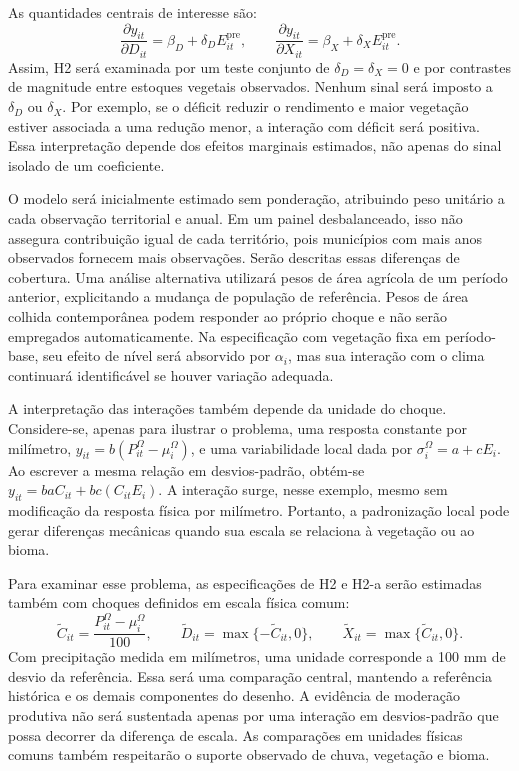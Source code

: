 As quantidades centrais de interesse são:
\begin{equation}
\frac{\partial y_{it}}{\partial D_{it}}=\beta_D+\delta_D E^{\mathrm{pre}}_{it},
\qquad
\frac{\partial y_{it}}{\partial X_{it}}=\beta_X+\delta_X E^{\mathrm{pre}}_{it}.
\label{eq:marginais}
\end{equation}
Assim, H2 será examinada por um teste conjunto de $\delta_D=\delta_X=0$ e por contrastes de magnitude entre estoques vegetais observados. Nenhum sinal será imposto a $\delta_D$ ou $\delta_X$. Por exemplo, se o déficit reduzir o rendimento e maior vegetação estiver associada a uma redução menor, a interação com déficit será positiva. Essa interpretação depende dos efeitos marginais estimados, não apenas do sinal isolado de um coeficiente.

O modelo será inicialmente estimado sem ponderação, atribuindo peso unitário a cada observação territorial e anual. Em um painel desbalanceado, isso não assegura contribuição igual de cada território, pois municípios com mais anos observados fornecem mais observações. Serão descritas essas diferenças de cobertura. Uma análise alternativa utilizará pesos de área agrícola de um período anterior, explicitando a mudança de população de referência. Pesos de área colhida contemporânea podem responder ao próprio choque e não serão empregados automaticamente. Na especificação com vegetação fixa em período-base, seu efeito de nível será absorvido por $\alpha_i$, mas sua interação com o clima continuará identificável se houver variação adequada.

A interpretação das interações também depende da unidade do choque. Considere-se, apenas para ilustrar o problema, uma resposta constante por milímetro, $y_{it}=b(P^{\Omega}_{it}-\mu_i^{\Omega})$, e uma variabilidade local dada por $\sigma_i^{\Omega}=a+cE_i$. Ao escrever a mesma relação em desvios-padrão, obtém-se $y_{it}=baC_{it}+bc(C_{it}E_i)$. A interação surge, nesse exemplo, mesmo sem modificação da resposta física por milímetro. Portanto, a padronização local pode gerar diferenças mecânicas quando sua escala se relaciona à vegetação ou ao bioma.

Para examinar esse problema, as especificações de H2 e H2-a serão estimadas também com choques definidos em escala física comum:
\begin{equation}
\widetilde C_{it}=\frac{P^{\Omega}_{it}-\mu_i^{\Omega}}{100},\qquad
\widetilde D_{it}=\max\{-\widetilde C_{it},0\},\qquad
\widetilde X_{it}=\max\{\widetilde C_{it},0\}.
\label{eq:choquecomum}
\end{equation}
Com precipitação medida em milímetros, uma unidade corresponde a 100 mm de desvio da referência. Essa será uma comparação central, mantendo a referência histórica e os demais componentes do desenho. A evidência de moderação produtiva não será sustentada apenas por uma interação em desvios-padrão que possa decorrer da diferença de escala. As comparações em unidades físicas comuns também respeitarão o suporte observado de chuva, vegetação e bioma.

